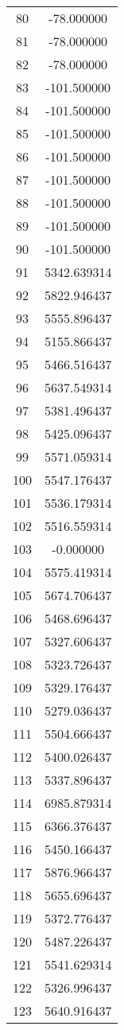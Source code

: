 \documentclass[12pt]{article}
\begin{document}
\begin{longtable}{@{}cc@{}}
80 & -78.000000 \\
81 & -78.000000 \\
82 & -78.000000 \\
83 & -101.500000 \\
84 & -101.500000 \\
85 & -101.500000 \\
86 & -101.500000 \\
87 & -101.500000 \\
88 & -101.500000 \\
89 & -101.500000 \\
90 & -101.500000 \\
91 & 5342.639314 \\
92 & 5822.946437 \\
93 & 5555.896437 \\
94 & 5155.866437 \\
95 & 5466.516437 \\
96 & 5637.549314 \\
97 & 5381.496437 \\
98 & 5425.096437 \\
99 & 5571.059314 \\
100 & 5547.176437 \\
101 & 5536.179314 \\
102 & 5516.559314 \\
103 & -0.000000 \\
104 & 5575.419314 \\
105 & 5674.706437 \\
106 & 5468.696437 \\
107 & 5327.606437 \\
108 & 5323.726437 \\
109 & 5329.176437 \\
110 & 5279.036437 \\
111 & 5504.666437 \\
112 & 5400.026437 \\
113 & 5337.896437 \\
114 & 6985.879314 \\
115 & 6366.376437 \\
116 & 5450.166437 \\
117 & 5876.966437 \\
118 & 5655.696437 \\
119 & 5372.776437 \\
120 & 5487.226437 \\
121 & 5541.629314 \\
122 & 5326.996437 \\
123 & 5640.916437 \\

\end{longtable}
\end{document}
